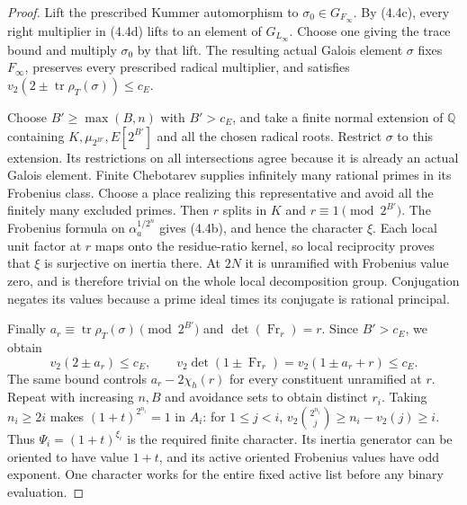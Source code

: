 \documentclass[11pt]{article}
\theoremstyle{definition}
\theoremstyle{remark}
\newcommand{\Q}{\mathbb Q}
\begin{document}
\begin{proof}
Lift the prescribed Kummer automorphism to
$\sigma_0\in G_{F_\infty}$. By (4.4c), every right multiplier in
(4.4d) lifts to an element of $G_{L_\infty}$. Choose one giving the
trace bound and multiply $\sigma_0$ by that lift. The resulting
actual Galois element $\sigma$ fixes $F_\infty$, preserves every
prescribed radical multiplier, and satisfies
$v_2(2\pm\operatorname{tr}\rho_T(\sigma))\le c_E$.

Choose $B'\ge\max(B,n)$ with $B'>c_E$, and take a finite normal
extension of $\Q$ containing $K,\mu_{2^{B'}},E[2^{B'}]$ and all
the chosen radical roots. Restrict $\sigma$ to this extension.
Its restrictions on all intersections agree because it is already
an actual Galois element. Finite Chebotarev supplies infinitely many
rational primes in its Frobenius class. Choose a place realizing
this representative and avoid all the finitely many excluded primes.
Then $r$ splits in $K$ and $r\equiv1\pmod{2^{B'}}$. The Frobenius
formula on $\alpha_a^{1/2^n}$ gives (4.4b), and hence the character
$\xi$. Each local unit factor at $r$ maps onto the residue-ratio
kernel, so local reciprocity proves that $\xi$ is surjective on
inertia there. At $2N$ it is unramified with Frobenius value zero,
and is therefore trivial on the whole local decomposition group.
Conjugation negates its values because a prime ideal times its
conjugate is rational principal.

Finally $a_r\equiv\operatorname{tr}\rho_T(\sigma)\pmod{2^{B'}}$
and $\det(\operatorname{Fr}_r)=r$. Since $B'>c_E$, we obtain
\[
 v_2(2\pm a_r)\le c_E,\qquad
 v_2\det(1\pm\operatorname{Fr}_r)
       =v_2(1\pm a_r+r)\le c_E.
\]
The same bound controls $a_r-2\chi_h(r)$ for every constituent
unramified at $r$. Repeat with increasing $n,B$ and avoidance sets
to obtain distinct $r_i$. Taking $n_i\ge2i$ makes
$(1+t)^{2^{n_i}}=1$ in $A_i$: for $1\le j<i$,
$v_2\binom{2^{n_i}}j\ge n_i-v_2(j)\ge i$.
Thus $\Psi_i=(1+t)^{\xi_i}$ is the required finite character.
Its inertia generator can be oriented to have value $1+t$, and its
active oriented Frobenius values have odd exponent. One character
works for the entire fixed active list before any binary evaluation.
\end{proof}
\end{document}
